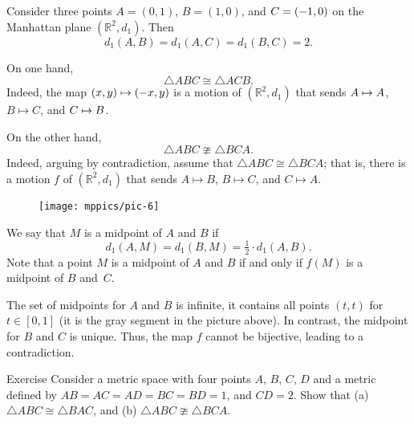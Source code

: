 \label{example:isometric but not congruent}
Consider three points 
$A=(0,1)$, $B=(1,0)$, and $C=(-1,0)$ on the Manhattan plane $(\mathbb{R}^2,d_1)$.
Then
$$d_1(A,B)=d_1(A,C)=d_1(B,C)=2.$$

On one hand,
$$\triangle ABC\cong \triangle ACB.$$
Indeed, the map $(x,y)\mapsto (-x,y)$ is a motion of $(\mathbb{R}^2,d_1)$
that sends $A\mapsto A$, $B\mapsto C$, and $C\mapsto B$.

On the other hand,
$$\triangle ABC\ncong \triangle BCA.$$
Indeed, arguing by contradiction, assume that $\triangle ABC\cong \triangle BCA$; that is, there is a motion $f$ of $(\mathbb{R}^2,d_1)$ that sends $A\mapsto B$, $B\mapsto C$, and $C\mapsto A$.

\begin{wrapfigure}[6]{o}{33mm}
\vskip-5mm
\centering
\texttt{[image: mppics/pic-6]}
\end{wrapfigure}

We say that $M$ is a midpoint of $A$ and $B$ if 
\[d_1(A,M)=d_1(B,M)=\tfrac12\cdot d_1(A,B).\]
Note that a point $M$ is a midpoint of $A$ and $B$ if and only if $f(M)$ is a midpoint of $B$ and~$C$.

The set of midpoints for $A$ and $B$ is infinite, it contains all points $(t,t)$ for $t\in[0,1]$ (it is the gray segment in the picture above).
In contrast, the midpoint for $B$ and $C$ is unique.
Thus, the map $f$ cannot be bijective, leading to a contradiction.

\begin{thm}{Exercise}\label{ex:ncong}
Consider a metric space with four points $A$, $B$, $C$, $D$ and a metric defined by $AB=AC=AD=BC=BD=1$, and 
$CD=2$.
Show that (a) $\triangle ABC\cong \triangle BAC$, and (b) $\triangle ABC\ncong \triangle BCA$.
\end{thm}

